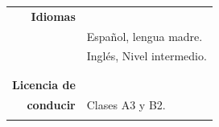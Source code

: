 \documentclass[a4paper,10pt, sans]{article}
\begin{document}
\begin{table}[H]
\begin{tabularx}{\textwidth}{r X}
\textbf{Idiomas} & {} \\ [1ex]
    {} & Español, lengua madre. \\ [1ex]
    {} & Inglés, Nivel intermedio. \\ \\ \hline \\
      
    \textbf{Licencia de} & {} \\ [1ex]
    \textbf{conducir} & Clases A3 y B2.\\
    
\vspace{5cm}
    
    
    
    
        
  \end{tabularx}
  \end{table}
  
\end{document}
